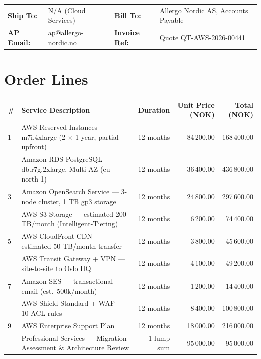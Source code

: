\documentclass[a4paper,11pt]{article}
\begin{document}
\begin{tabularx}{\textwidth}{lX lX}
  \textbf{Ship To:}   & N/A (Cloud Services) &
  \textbf{Bill To:}   & Allergo Nordic AS, Accounts Payable \\
  \textbf{AP Email:}  & ap@allergo-nordic.no &
  \textbf{Invoice Ref:} & Quote QT-AWS-2026-00441 \\
\end{tabularx}

\section{Order Lines}

\begin{tabularx}{\textwidth}{>{\centering}p{0.5cm} >{\raggedright}X r r r}
  \rowcolor{brand}
  \color{white}\textbf{\#} &
  \color{white}\textbf{Service Description} &
  \color{white}\textbf{Duration} &
  \color{white}\textbf{Unit Price (NOK)} &
  \color{white}\textbf{Total (NOK)} \\
  \rowcolor{lightgray}
  1 & AWS Reserved Instances — m7i.4xlarge (2 $\times$ 1-year, partial upfront) &
    12 months & 84\,200.00 & 168\,400.00 \\
  2 & Amazon RDS PostgreSQL — db.r7g.2xlarge, Multi-AZ (eu-north-1) &
    12 months & 36\,400.00 & 436\,800.00 \\
  \rowcolor{lightgray}
  3 & Amazon OpenSearch Service — 3-node cluster, 1 TB gp3 storage &
    12 months & 24\,800.00 & 297\,600.00 \\
  4 & AWS S3 Storage — estimated 200 TB/month (Intelligent-Tiering) &
    12 months & 6\,200.00 & 74\,400.00 \\
  \rowcolor{lightgray}
  5 & AWS CloudFront CDN — estimated 50 TB/month transfer &
    12 months & 3\,800.00 & 45\,600.00 \\
  6 & AWS Transit Gateway + VPN — site-to-site to Oslo HQ &
    12 months & 4\,100.00 & 49\,200.00 \\
  \rowcolor{lightgray}
  7 & Amazon SES — transactional email (est.\ 500k/month) &
    12 months & 1\,200.00 & 14\,400.00 \\
  8 & AWS Shield Standard + WAF — 10 ACL rules &
    12 months & 8\,400.00 & 100\,800.00 \\
  \rowcolor{lightgray}
  9 & AWS Enterprise Support Plan &
    12 months & 18\,000.00 & 216\,000.00 \\
  10 & Professional Services — Migration Assessment \& Architecture Review &
    1 lump sum & 95\,000.00 & 95\,000.00 \\
  \bottomrule
\end{tabularx}
\end{document}
